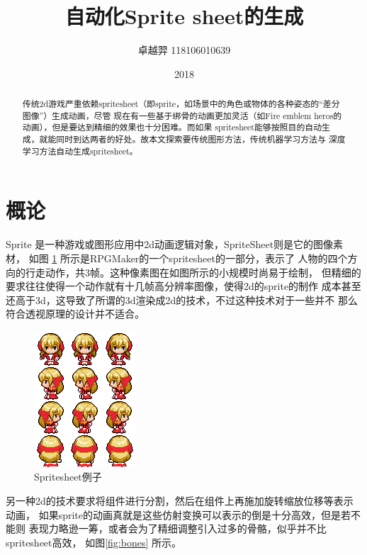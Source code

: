\documentclass[twocolumn,11pt]{ctexart}
\title{自动化Sprite sheet的生成}
\author{卓越羿 118106010639}
\date{2018}
\begin{document}
\maketitle


\begin{abstract}
    传统2d游戏严重依赖spritesheet（即sprite，如场景中的角色或物体的各种姿态的“差分图像”）生成动画，尽管
    现在有一些基于绑骨的动画更加灵活（如Fire emblem heros的动画），但是要达到精细的效果也十分困难。而如果
    spritesheet能够按照目的自动生成，就能同时到达两者的好处。故本文探索要传统图形方法，传统机器学习方法与
    深度学习方法自动生成spritesheet。
\end{abstract}

\section{概论}

Sprite 是一种游戏或图形应用中2d动画逻辑对象，SpriteSheet则是它的图像素材，
如图 \ref{fig:highpriest} 所示是RPGMaker的一个spritesheet的一部分，表示了
人物的四个方向的行走动作，共3帧。这种像素图在如图所示的小规模时尚易于绘制，
但精细的要求往往使得一个动作就有十几帧高分辨率图像，使得2d的sprite的制作
成本甚至还高于3d，这导致了所谓的3d渲染成2d的技术，不过这种技术对于一些并不
那么符合透视原理的设计并不适合。


\begin{figure}[htb]
    \centering
    \includegraphics[width=0.3\linewidth]{H.png}
    \caption{Spritesheet例子}
    \label{fig:highpriest}
\end{figure}

另一种2d的技术要求将组件进行分割，然后在组件上再施加旋转缩放位移等表示动画，
如果sprite的动画真就是这些仿射变换可以表示的倒是十分高效，但是若不能则
表现力略逊一筹，或者会为了精细调整引入过多的骨骼，似乎并不比spritesheet高效，
如图\ref{fig:bones}  \cite{zhihu2d}
所示。
\end{document}
